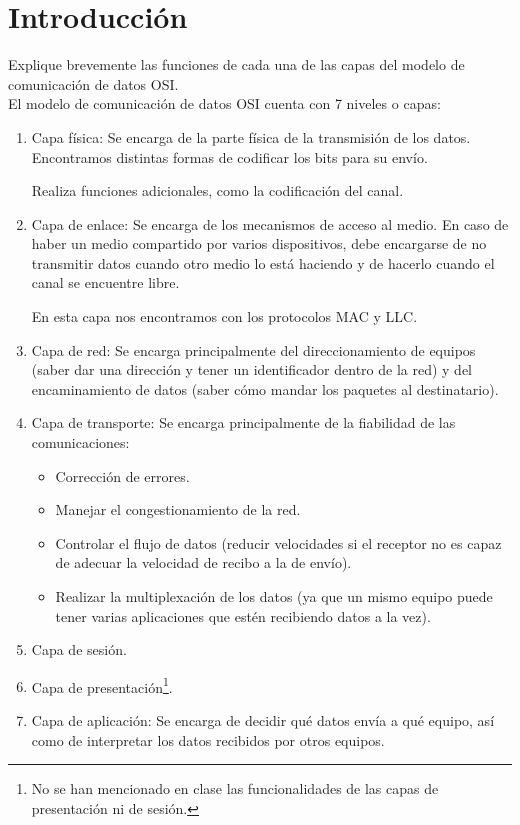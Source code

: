 \section{Introducción}

\begin{ejercicio}
   Explique brevemente las funciones de cada una de las capas del modelo de comunicación de datos OSI\@. \\

   El modelo de comunicación de datos OSI cuenta con 7 niveles o capas:
   \begin{enumerate}
       \item Capa física: Se encarga de la parte física de la transmisión de los datos. Encontramos distintas formas de codificar los bits para su envío. 

           Realiza funciones adicionales, como la codificación del canal.
       \item Capa de enlace: Se encarga de los mecanismos de acceso al medio. En caso de haber un medio compartido por varios dispositivos, debe encargarse de no transmitir datos cuando otro medio lo está haciendo y de hacerlo cuando el canal se encuentre libre.

           En esta capa nos encontramos con los protocolos MAC y LLC\@.
       \item Capa de red: Se encarga principalmente del direccionamiento de equipos (saber dar una dirección y tener un identificador dentro de la red) y del encaminamiento de datos (saber cómo mandar los paquetes al destinatario).
       \item Capa de transporte: Se encarga principalmente de la fiabilidad de las comunicaciones:
           \begin{itemize}
               \item Corrección de errores.
               \item Manejar el congestionamiento de la red.
               \item Controlar el flujo de datos (reducir velocidades si el receptor no es capaz de adecuar la velocidad de recibo a la de envío).
               \item Realizar la multiplexación de los datos (ya que un mismo equipo puede tener varias aplicaciones que estén recibiendo datos a la vez).
           \end{itemize}

       \item Capa de sesión.
        \item Capa de presentación\footnote{No se han mencionado en clase las funcionalidades de las capas de presentación ni de sesión.}.
        \item Capa de aplicación: Se encarga de decidir qué datos envía a qué equipo, así como de interpretar los datos recibidos por otros equipos.
   \end{enumerate}
\end{ejercicio}

